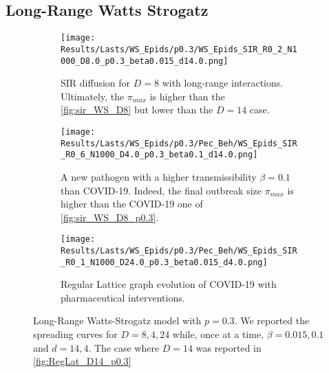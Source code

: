 \documentclass[a4paper,10pt,twoside]{book} %
\theoremstyle{definition}
\begin{document}
\clearpage
\subsection{Long-Range Watts Strogatz}
\begin{figure}[htbp]
    \centering
	\begin{subfigure}[t]{\textwidth}
        \centering
        \texttt{[image: Results/Lasts/WS\_Epids/p0.3/WS\_Epids\_SIR\_R0\_2\_N1000\_D8.0\_p0.3\_beta0.015\_d14.0.png]} 
        \caption{SIR diffusion for $ D = 8$ with long-range interactions. Ultimately, the $ \pi_{max} $ is higher than the \autoref{fig:sir_WS_D8} but lower than the $ D = 14$ case.} 
		\label{fig:sir_WS_D8_p0.3}
    \end{subfigure}
	\vfill
	\begin{subfigure}[t]{\textwidth}
        \centering
        \texttt{[image: Results/Lasts/WS\_Epids/p0.3/Pec\_Beh/WS\_Epids\_SIR\_R0\_6\_N1000\_D4.0\_p0.3\_beta0.1\_d14.0.png]}
        \caption{A new pathogen with a higher transmissibility $ \beta = 0.1$ than COVID-19. Indeed, the final outbreak size $\pi_{max} $ is higher than the COVID-19 one of \autoref{fig:sir_WS_D8_p0.3}.} 
		\label{fig:sir_WS_D4_b0.1_p0.3}
    \end{subfigure}
	\vfill
    \begin{subfigure}[t]{\textwidth}
        \centering
        \texttt{[image: Results/Lasts/WS\_Epids/p0.3/Pec\_Beh/WS\_Epids\_SIR\_R0\_1\_N1000\_D24.0\_p0.3\_beta0.015\_d4.0.png]} 
        \caption{Regular Lattice graph evolution of COVID-19 with pharmaceutical interventions.} 
		\label{fig:sir_WS_D24_d4_p0.3}
    \end{subfigure}
    \caption{Long-Range Watts-Strogatz model with $ p = 0.3$. We reported the spreading curves for $D = 8, 4, 24$ while, once at a time, $ \beta = 0.015, 0.1$ and $ d = 14,4$. The case where $ D = 14$ was reported in \autoref{fig:RegLat_D14_p0.3}}
	\label{fig:sir_WS_D5D5b0.1_D24d4_p0.3}
\end{figure}

\clearpage
{}
\end{document}
